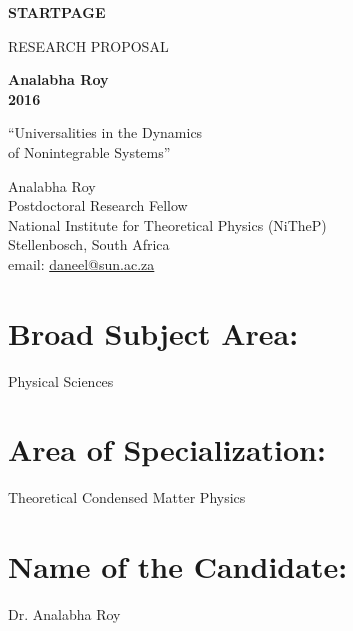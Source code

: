 \documentclass[a4paper,11pt,color]{article}
\def\Acronimo{Universalities in the Dynamics\\ of Nonintegrable Systems}
\begin{document}


\phantom{a}
\vspace{15mm}
\begin{center}


        \Large{
      
     
        \textbf{STARTPAGE}
  
          \vspace{15mm}
          RESEARCH PROPOSAL\\
          \vspace{1cm}
          
          \textbf{Analabha Roy}\\
          \textbf{2016}
          \vspace{2cm}                   

          
          \vspace{2cm}

          ``\Acronimo''
                    \vspace{2cm}

          Analabha Roy \\
          Postdoctoral Research Fellow \\
          National Institute for Theoretical Physics (NiTheP) \\
          Stellenbosch, South Africa \\
          email: \url{daneel@sun.ac.za}
        }

  \end{center}
\vspace{1cm}
\pagebreak
\section{\sc Broad Subject Area:}
Physical Sciences

\section{\sc Area of Specialization:} 
Theoretical Condensed Matter Physics

\section{\sc Name of the Candidate:} 
Dr. Analabha Roy
\end{document}
